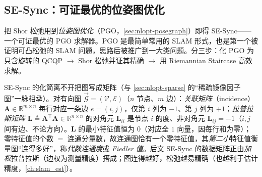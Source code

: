 \subsection{SE-Sync：可证最优的位姿图优化}
\label{sec:nlopt-certifiable-sesync}

把 Shor 松弛用到\emph{位姿图优化}（PGO，\cref{sec:nlopt-posegraph}）即得 SE-Sync\cite{rosen2019sesync}——一个可证最优的 PGO 求解器。PGO 是最简单常用的 SLAM 形式，也是第一个被证明可凸松弛的 SLAM 问题，思路后被推广到一大类问题。分三步：化 PGO 为只含旋转的 QCQP $\to$ Shor 松弛并证其精确 $\to$ 用 Riemannian Staircase 高效求解。

\begin{insight}
SE-Sync 的化简离不开把图写成矩阵（与 \cref{sec:nlopt-sparse} 的“稀疏镜像因子图”一脉相承）。对有向图 $\overrightarrow{\mathcal{G}}=(\mathcal{V},\mathcal{E})$（$n$ 节点、$m$ 边）：\emph{关联矩阵}（incidence）$\mathbf{A}\in\mathbb{R}^{m\times n}$ 每行对应一条边 $e=(i,j)$，仅第 $i$ 列为 $-1$、第 $j$ 列为 $+1$；\emph{拉普拉斯矩阵} $\mathbf{L}\triangleq\mathbf{A}^\top\mathbf{A}\in\mathbb{R}^{n\times n}$ 的对角元 $\mathbf{L}_{ii}$ 是节点 $i$ 的度、非对角元 $\mathbf{L}_{ij}=-1$（$i,j$ 间有边、不论方向）。$\mathbf{L}$ 的最小特征值恒为 $0$（对应全 $1$ 向量，因每行和为零）；零特征值的个数 $=$ 连通分量数，故连通图恰有一个零特征值，其\emph{第二小}特征值衡量图“连得多好”，称\emph{代数连通度}或 \emph{Fiedler 值}。后文 SE-Sync 的数据矩阵正由\emph{加权}拉普拉斯（边权为测量精度）搭成；图连得越好，松弛越易精确（也越利于估计精度，\cref{ch:slam_est}）。
\end{insight}

